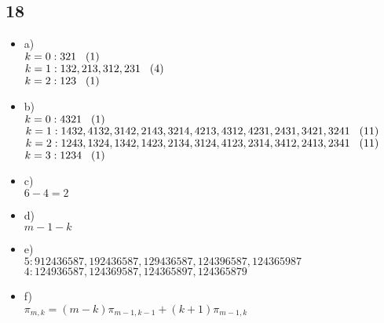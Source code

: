 \documentclass[a4paper]{article}
\begin{document}
\subsection{18}
\begin{itemize}
  \item a)\\
    $k=0: 321 \hspace{3mm} (1)$\\
    $k=1: 132, 213, 312, 231 \hspace{3mm} (4)$\\
    $k=2: 123 \hspace{3mm} (1)$\\
  \item b)\\
    $k=0: 4321 \hspace{3mm} (1)$\\
    $k=1: 1432, 4132, 3142, 2143, 3214, 4213, 4312, 4231, 2431, 3421, 3241 \hspace{3mm} (11)$\\
    $k=2: 1243, 1324, 1342, 1423, 2134, 3124, 4123, 2314, 3412, 2413, 2341 \hspace{3mm} (11)$\\
    $k=3: 1234 \hspace{3mm} (1)$\\
  \item c)\\
  $6-4=2$
  \item d)\\
  $m-1-k$
  \item e)\\
  $5: 912436587,192436587,129436587,124396587,124365987$\\
  $4: 124936587,124369587,124365897,124365879$\\
  \item f)\\
  $\pi_{m,k}=(m-k)\pi_{m-1,k-1}+(k+1)\pi_{m-1,k}$
\end{itemize}
\end{document}
